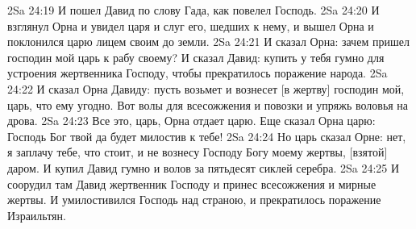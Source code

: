 2Sa 24:19  И пошел Давид по слову Гада, как повелел Господь.
2Sa 24:20  И взглянул Орна и увидел царя и слуг его, шедших к нему, и вышел Орна и поклонился царю лицем своим до земли.
2Sa 24:21  И сказал Орна: зачем пришел господин мой царь к рабу своему? И сказал Давид: купить у тебя гумно для устроения жертвенника Господу, чтобы прекратилось поражение народа.
2Sa 24:22  И сказал Орна Давиду: пусть возьмет и вознесет [в жертву] господин мой, царь, что ему угодно. Вот волы для всесожжения и повозки и упряжь воловья на дрова.
2Sa 24:23  Все это, царь, Орна отдает царю. Еще сказал Орна царю: Господь Бог твой да будет милостив к тебе!
2Sa 24:24  Но царь сказал Орне: нет, я заплачу тебе, что стоит, и не вознесу Господу Богу моему жертвы, [взятой] даром. И купил Давид гумно и волов за пятьдесят сиклей серебра.
2Sa 24:25  И соорудил там Давид жертвенник Господу и принес всесожжения и мирные жертвы. И умилостивился Господь над страною, и прекратилось поражение Израильтян.


